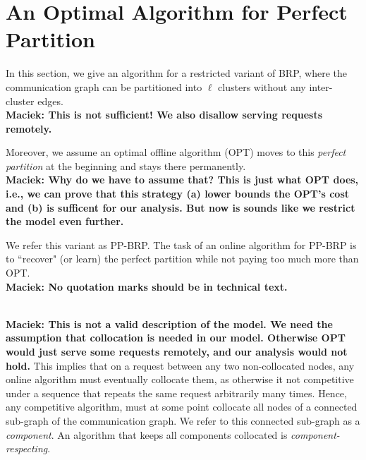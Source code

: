 \documentclass[manuscript,screen=true]{acmart}
\newcommand{\OBRP}{BRP}
\newcommand{\PPOBRP}{PP-BRP}
\newcommand\mahmoud[1]{\color{green}\textbf{\\ Mahmoud: #1}\\\color{black}}
\newcommand\maciek[1]{\color{brown}\textbf{\\ Maciek: #1}\color{black}}
\begin{document}
\section{An Optimal Algorithm for Perfect Partition}	\label{sec:ppl}


In this section,
we give an algorithm for a restricted variant of  \OBRP{},
where the communication graph can be partitioned into $\ell$ clusters without any inter-cluster edges.
\maciek{This is not sufficient! We also disallow serving requests remotely.}

Moreover, we assume an optimal offline algorithm (OPT) moves to this \emph{perfect partition}
at the beginning and stays there permanently.
\maciek{Why do we have to assume that? This is just what OPT does, i.e., we can prove that this strategy (a) lower bounds the OPT's cost and (b) is sufficent for our analysis. But now is sounds like we restrict the model even further.}

We refer this variant as \PPOBRP{}.
The task of an online algorithm for \PPOBRP{} is to ``recover" (or learn) the perfect partition while not paying too much more than OPT.\maciek{No quotation marks should be in technical text.}

\maciek{This is not a valid description of the model. We need the assumption that collocation is needed in our model. Otherwise OPT would just serve some requests remotely, and our analysis would not hold.}
This implies that on a request between any two non-collocated nodes,
any online algorithm must eventually collocate them,
as otherwise it not competitive under a sequence that repeats the same request arbitrarily many times.
Hence,
any competitive algorithm,
must at some point collocate all nodes of a  connected sub-graph of the communication graph.
We refer to this connected sub-graph as a \emph{component}.
An algorithm that  keeps all components collocated is \emph{component-respecting}.
\end{document}
